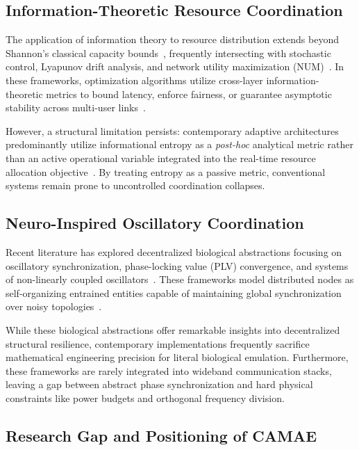 \documentclass[journal,10pt,twocolumn,twoside]{IEEEtran}
\begin{document}
\subsection{Information-Theoretic Resource Coordination}

The application of information theory to resource distribution extends beyond Shannon's classical capacity bounds~\cite{cover1991elements}, frequently intersecting with stochastic control, Lyapunov drift analysis, and network utility maximization (NUM)~\cite{tse2005fundamentals}. In these frameworks, optimization algorithms utilize cross-layer information-theoretic metrics to bound latency, enforce fairness, or guarantee asymptotic stability across multi-user links~\cite{sampath2002generalized, wong1999multiuser}.

However, a structural limitation persists: contemporary adaptive architectures predominantly utilize informational entropy as a \textit{post-hoc} analytical metric rather than an active operational variable integrated into the real-time resource allocation objective~\cite{thompson2020resilience}. By treating entropy as a passive metric, conventional systems remain prone to uncontrolled coordination collapses.

\subsection{Neuro-Inspired Oscillatory Coordination}

Recent literature has explored decentralized biological abstractions focusing on oscillatory synchronization, phase-locking value (PLV) convergence, and systems of non-linearly coupled oscillators~\cite{kuramoto1975self, acebron2005kuramoto}. These frameworks model distributed nodes as self-organizing entrained entities capable of maintaining global synchronization over noisy topologies~\cite{barbarossa2007distributed}.

While these biological abstractions offer remarkable insights into decentralized structural resilience, contemporary implementations frequently sacrifice mathematical engineering precision for literal biological emulation. Furthermore, these frameworks are rarely integrated into wideband communication stacks, leaving a gap between abstract phase synchronization and hard physical constraints like power budgets and orthogonal frequency division.

\subsection{Research Gap and Positioning of CAMAE}
\end{document}
